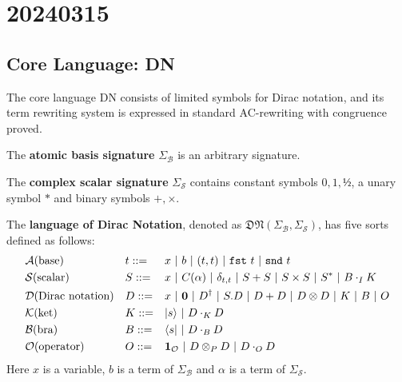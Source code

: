 \chapter{20240315}

\newcommand*{\unit}{\texttt{unit}}
\newcommand*{\utt}{\texttt{tt}}
\newcommand*{\fst}{\texttt{fst}}
\newcommand*{\snd}{\texttt{snd}}
\newcommand*{\reduce}{\ \triangleright\ }
\newcommand*{\reducefrom}{\ \triangleleft\ }

\newcommand*{\zeroK}[1]{\mathbf{0}_{\mathcal{K}(#1)}}
\newcommand*{\zeroB}[1]{\mathbf{0}_{\mathcal{B}(#1)}}
\newcommand*{\zeroO}[1]{\mathbf{0}_{\mathcal{O}(#1)}}


\section{Core Language: DN}

The core language DN consists of limited symbols for Dirac notation, and its term rewriting system is expressed in standard AC-rewriting with congruence proved.

\begin{definition} 
  The \textbf{atomic basis signature} $\Sigma_\mathcal{B}$ is an arbitrary signature.
\end{definition}

\begin{definition} 
  The \textbf{complex scalar signature} $\Sigma_\mathcal{S}$ contains constant symbols $0, 1, \text{½}$, a unary symbol $*$ and binary symbols $+, \times$.
\end{definition}

\begin{definition}
  The \textbf{language of Dirac Notation}, denoted as $\mathfrak{DN}(\Sigma_\mathcal{B}, \Sigma_\mathcal{S})$, has five sorts defined as follows:
  \begin{align*}
    & \mathcal{A} \textrm{(base)} && t ::= && x\ |\ b\ |\ (t, t)\ |\ \fst\ t\ |\ \snd\ t \\
    & \mathcal{S} \textrm{(scalar)} && S ::= && x\ |\ C(\alpha)\ |\ \delta_{t, t}\ |\ S + S\ |\ S \times S\ |\ S^*\ |\ B \cdot_I K \\
    & \mathcal{D} \textrm{(Dirac notation)} && D ::= && x\ |\ \mathbf{0}\ |\ D^\dagger\ |\ S.D\ |\ D + D\ |\ D \otimes D\ |\ K\ |\ B\ |\ O \\
    & \mathcal{K} \textrm{(ket)} && K ::= && \ket{s}\ |\ D \cdot_{K} D \\
    & \mathcal{B} \textrm{(bra)} && B ::= && \bra{s}\ |\ D \cdot_{B} D \\
    & \mathcal{O} \textrm{(operator)} && O ::= && \mathbf{1}_\mathcal{O}\ |\ D \otimes_P D\ |\ D \cdot_{O} D
  \end{align*}
  Here $x$ is a variable, $b$ is a term of $\Sigma_\mathcal{B}$ and $\alpha$ is a term of $\Sigma_\mathcal{S}$.

\end{definition}

